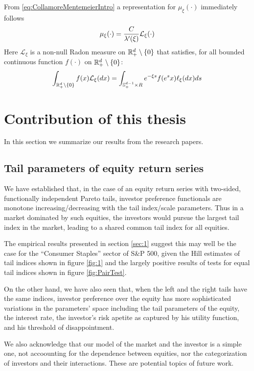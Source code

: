 From \eqref{eq:CollamoreMentemeierIntro} a representation for $\mu_\xi
(\cdot)$ immediately follows  
\[
\mu_\xi (\cdot) = {C \over \lambda'(\xi)} \mathcal L_\xi(\cdot)
\]
Here $\mathcal L_\xi$ is a non-null Radon measure  on
$\mathbb R^d_+ \setminus \{0\}$ that satisfies, for all
bounded continuous function $f(\cdot)$ on
$\mathbb R_+^{d} \setminus \{0\}$:
\[
\int_{\mathbb R_+^d\setminus \{0\}} f(x) \mathcal L_\xi(dx)
=
\int_{\mathbb S^{d-1}_+ \times R} e^{-\xi s} f(e^s x) \ell_\xi(dx) ds
\]


 
\section{Contribution of this thesis}\label{sec:contr}

In this section we summarize our results from the research papers.

\subsection{Tail parameters of equity return series}
We have established that, in the case of an equity return series with
two-sided, functionally independent Pareto tails, investor
preference functionals are monotone increasing/decreasing with the
tail index/scale parameters. Thus in a market dominated by such
equities, the investors would pursue the largest tail index in the
market, leading to a shared common tail index for all equities.

The empirical results presented in section \ref{sec:1} suggest this
may well be the case for the ``Consumer Staples'' sector of S\&P 500,
given the Hill estimates of tail indices shown in figure \ref{fig:1}
and the largely positive results of tests for equal tail indices shown
in figure \ref{fig:PairTest}.

On the other hand, we have also seen that, when the left and the right
tails have the same indices, investor preference over the equity has
more sophisticated variations in the parameters' space including the
tail parameters of the equity, the interest rate, the investor's risk
apetite as captured by his utility function, and his threshold of
disappointment.

We also acknowledge that our model of the market and the investor is a
simple one, not accoounting for the dependence between equities, nor
the categorization of investors and their interactions. These are
potential topics of future work.

